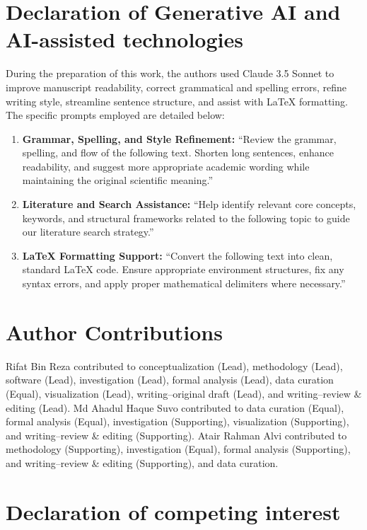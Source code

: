 \documentclass[a4paper,fleqn]{cas-dc}
\begin{document}
\section*{Declaration of Generative AI and AI-assisted technologies}

During the preparation of this work, the authors used Claude 3.5 Sonnet to improve manuscript readability, correct grammatical and spelling errors, refine writing style, streamline sentence structure, and assist with LaTeX formatting. The specific prompts employed are detailed below:

\begin{enumerate}
    \item \textbf{Grammar, Spelling, and Style Refinement:} ``Review the grammar, spelling, and flow of the following text. Shorten long sentences, enhance readability, and suggest more appropriate academic wording while maintaining the original scientific meaning.''
    \item \textbf{Literature and Search Assistance:} ``Help identify relevant core concepts, keywords, and structural frameworks related to the following topic to guide our literature search strategy.''
    \item \textbf{LaTeX Formatting Support:} ``Convert the following text into clean, standard LaTeX code. Ensure appropriate environment structures, fix any syntax errors, and apply proper mathematical delimiters where necessary.''
\end{enumerate}

\section*{Author Contributions}

Rifat Bin Reza contributed to conceptualization (Lead), methodology (Lead),
software (Lead), investigation (Lead), formal analysis (Lead), data curation
(Equal), visualization (Lead), writing--original draft (Lead), and
writing--review \& editing (Lead). Md Ahadul Haque Suvo contributed to data
curation (Equal), formal analysis (Equal), investigation (Supporting),
visualization (Supporting), and writing--review \& editing (Supporting).
Atair Rahman Alvi contributed to methodology (Supporting), investigation
(Equal), formal analysis (Supporting), and writing--review \& editing (Supporting), and data curation.


\section*{Declaration of competing interest}
\end{document}
